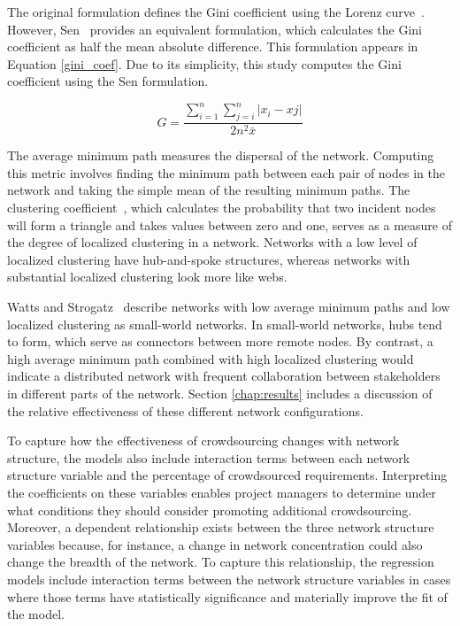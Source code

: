 The original formulation defines the Gini coefficient using the Lorenz curve~\cite{gini}. However, Sen~\cite{sen} provides an equivalent formulation, which calculates the Gini coefficient as half the mean absolute difference. This formulation appears in Equation \ref{gini_coef}. Due to its simplicity, this study computes the Gini coefficient using the Sen formulation.

\begin{equation}
\label{gini_coef}
    G = \frac{\sum_{i=1}^{n} \sum_{j=i}^{n} | x_{i} - x{j} |}{2n^2 \bar{x}}
\end{equation}

The average minimum path measures the dispersal of the network. Computing this metric involves finding the minimum path between each pair of nodes in the network and taking the simple mean of the resulting minimum paths. The clustering coefficient~\cite{holland}, which calculates the probability that two incident nodes will form a triangle and takes values between zero and one, serves as a measure of the degree of localized clustering in a network. Networks with a low level of localized clustering have hub-and-spoke structures, whereas networks with substantial localized clustering look more like webs.

Watts and Strogatz~\cite{watts} describe networks with low average minimum paths and low localized clustering as small-world networks. In small-world networks, hubs tend to form, which serve as connectors between more remote nodes. By contrast, a high average minimum path combined with high localized clustering would indicate a distributed network with frequent collaboration between stakeholders in different parts of the network. Section \ref{chap:results} includes a discussion of the relative effectiveness of these different network configurations.

To capture how the effectiveness of crowdsourcing changes with network structure, the models also include interaction terms between each network structure variable and the percentage of crowdsourced requirements. Interpreting the coefficients on these variables enables project managers to determine under what conditions they should consider promoting additional crowdsourcing. Moreover, a dependent relationship exists between the three network structure variables because, for instance, a change in network concentration could also change the breadth of the network. To capture this relationship, the regression models include interaction terms between the network structure variables in cases where those terms have statistically significance and materially improve the fit of the model.

